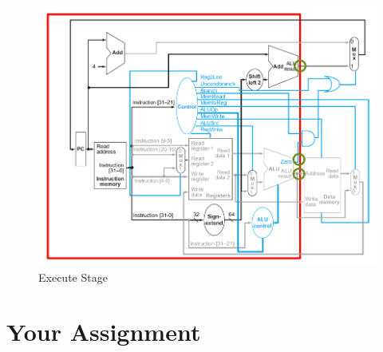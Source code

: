 \begin{figure}
	\caption{Execute Stage}\label{fig:integrated_execute}
	\begin{center}
		\includegraphics[width=4.75in]{../images/integrated_execute.png}
	\end{center}
\end{figure} 

\section{Your Assignment}

